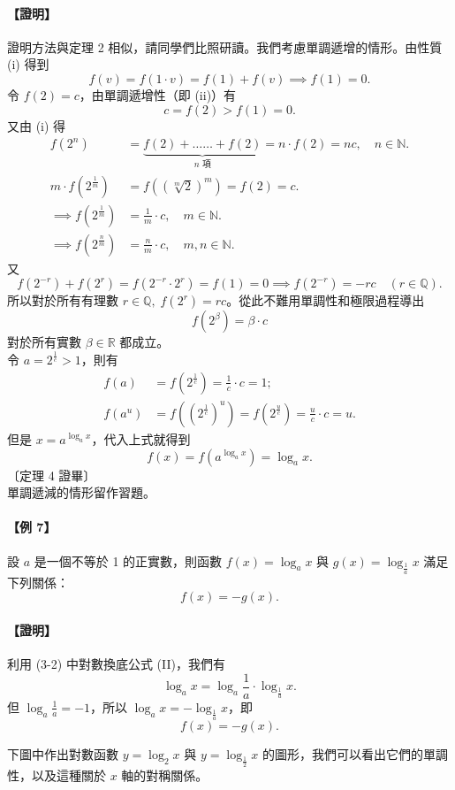 \paragraph{【證明】} 證明方法與定理 2 相似，請同學們比照研讀。我們考慮單調遞增的情形。由性質 (i) 得到
\[
f(v) = f(1\cdot v) = f(1) + f(v) \implies f(1) = 0.
\]
令 $f(2) = c$，由單調遞增性（即 (ii)）有
\[
c = f(2) > f(1) = 0.
\]
又由 (i) 得
\begin{align*}
f(2^n) &= \underbrace{f(2) + \dots\dots + f(2)}_{n \text{ 項}} = n\cdot f(2) = nc,\quad n \in \mathbb{N}. \\
m\cdot f(2^{\frac{1}{m}}) &= f((\sqrt[m]{2})^m) = f(2) = c. \\
\implies f(2^{\frac{1}{m}}) &= \frac{1}{m}\cdot c,\quad m \in \mathbb{N}. \\
\implies f(2^{\frac{n}{m}}) &= \frac{n}{m}\cdot c,\quad m, n \in \mathbb{N}.
\end{align*}
又
\[
f(2^{-r}) + f(2^r) = f(2^{-r}\cdot 2^r) = f(1) = 0 \implies f(2^{-r}) = -rc \quad (r \in \mathbb{Q}).
\]
所以對於所有有理數 $r \in \mathbb{Q},\; f(2^r) = rc$。從此不難用單調性和極限過程導出
\[
f(2^\beta) = \beta\cdot c
\]
對於所有實數 $\beta \in \mathbb{R}$ 都成立。\\
令 $a = 2^{\frac{1}{c}} > 1$，則有
\begin{align*}
f(a) &= f(2^{\frac{1}{c}}) = \frac{1}{c}\cdot c = 1; \\
f(a^u) &= f((2^{\frac{1}{c}})^u) = f(2^{\frac{u}{c}}) = \frac{u}{c}\cdot c = u.
\end{align*}
但是 $x = a^{\log_a x}$，代入上式就得到
\[
f(x) = f(a^{\log_a x}) = \log_a x.
\]
\hfill〔定理 4 證畢〕\\
單調遞減的情形留作習題。

\paragraph{【例 7】} 設 $a$ 是一個不等於 1 的正實數，則函數 $f(x) = \log_a x$ 與 $g(x) = \log_{\frac{1}{a}} x$ 滿足下列關係：
\[
f(x) = -g(x).
\]
\paragraph{【證明】} 利用 (3-2) 中對數換底公式 (II)，我們有
\[
\log_a x = \log_a \frac{1}{a} \cdot \log_{\frac{1}{a}} x.
\]
但 $\log_a \frac{1}{a} = -1$，所以 $\log_a x = -\log_{\frac{1}{a}} x$，即
\[
f(x) = -g(x).
\]

下圖中作出對數函數 $y = \log_2 x$ 與 $y = \log_{\frac{1}{2}} x$ 的圖形，我們可以看出它們的單調性，以及這種關於 $x$ 軸的對稱關係。

